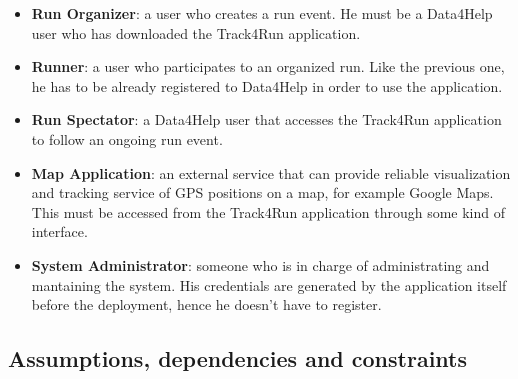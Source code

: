 \begin{itemize}
\item \textbf{Run Organizer}: a user who creates a run event. He must be a Data4Help user who has downloaded the Track4Run application.
 
\item \textbf{Runner}: a user who participates to an organized run. Like the previous one, he has to be already registered to Data4Help in order to use the application.

\item \textbf{Run Spectator}: a Data4Help user that accesses the Track4Run application to follow an ongoing run event.

\item \textbf{Map Application}: an external service that can provide reliable visualization and tracking service of GPS positions on a map, for example Google Maps. This must be accessed from the Track4Run application through some kind of interface.

\item \textbf{System Administrator}: someone who is in charge of administrating and mantaining the system. His credentials are generated by the application itself before the deployment, hence he doesn't have to register.

\end{itemize}

\subsection{Assumptions, dependencies and constraints}

